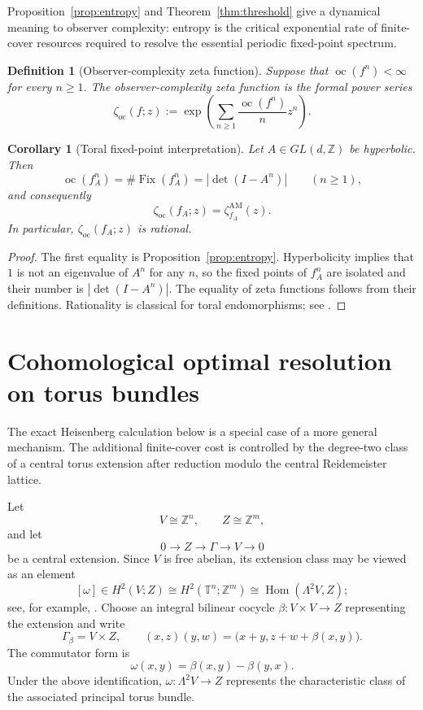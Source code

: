 \documentclass[11pt]{article}
\newtheorem{corollary}[theorem]{Corollary}
\newtheorem{definition}[theorem]{Definition}
\DeclareMathOperator{\Fix}{Fix}
\DeclareMathOperator{\oc}{oc}
\newcommand{\zetaoc}{\zeta_{\mathrm{oc}}}
\newcommand{\Z}{\mathbb Z}
\newcommand{\T}{\mathbb T}
\begin{document}
Proposition~\ref{prop:entropy} and Theorem~\ref{thm:threshold} give a dynamical meaning to
observer complexity: entropy is the critical exponential rate of finite-cover
resources required to resolve the essential periodic fixed-point spectrum.



\begin{definition}[Observer-complexity zeta function]
\label{def:oczeta}
Suppose that $\oc(f^n)<\infty$ for every $n\ge1$.  The
observer-complexity zeta function is the formal power series
\[
  \zetaoc(f;z)
  :=\exp\left(\sum_{n\ge1}\frac{\oc(f^n)}{n}z^n\right).
\]
\end{definition}

\begin{corollary}[Toral fixed-point interpretation]
\label{cor:toralzeta}
Let $A\in GL(d,\Z)$ be hyperbolic.  Then
\[
  \oc(f_A^n)=\#\Fix(f_A^n)=|\det(I-A^n)|
  \qquad(n\ge1),
\]
and consequently
\[
  \zetaoc(f_A;z)=\zeta^{\mathrm{AM}}_{f_A}(z).
\]
In particular, $\zetaoc(f_A;z)$ is rational.
\end{corollary}

\begin{proof}
The first equality is Proposition~\ref{prop:entropy}.  Hyperbolicity implies that
$1$ is not an eigenvalue of $A^n$ for any $n$, so the fixed points of $f_A^n$
are isolated and their number is $|\det(I-A^n)|$.  The equality of zeta
functions follows from their definitions.  Rationality is classical for
toral endomorphisms; see \cite{BaakeLauPaskunas}.
\end{proof}

\section{Cohomological optimal resolution on torus bundles}
\label{sec:cohomological}

The exact Heisenberg calculation below is a special case of a more general
mechanism.  The additional finite-cover cost is controlled by the degree-two
class of a central torus extension after reduction modulo the central
Reidemeister lattice.

Let
\[
  V\cong\Z^n,
  \qquad
  Z\cong\Z^m,
\]
and let
\[
  0\longrightarrow Z\longrightarrow \Gamma
  \longrightarrow V\longrightarrow0
\]
be a central extension.  Since $V$ is free abelian, its extension class may be
viewed as an element
\[
  [\omega]\in H^2(V;Z)
  \cong H^2(\T^n;\Z^m)
  \cong \operatorname{Hom}(\Lambda^2V,Z);
\]
see, for example, \cite{Brown,Husemoller,PalaisStewart}.  Choose an integral bilinear cocycle
$\beta\colon V\times V\to Z$ representing the extension and write
\[
  \Gamma_\beta=V\times Z,
  \qquad
  (x,z)(y,w)=\bigl(x+y,z+w+\beta(x,y)\bigr).
\]
The commutator form is
\[
  \omega(x,y)=\beta(x,y)-\beta(y,x).
\]
Under the above identification, $\omega\colon\Lambda^2V\to Z$ represents the
characteristic class of the associated principal torus bundle.
\end{document}
